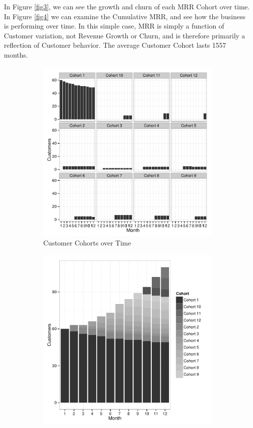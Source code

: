 \documentclass[11pt]{article}
\begin{document}
In Figure \ref{fig3}, we can see the growth and churn of each MRR Cohort over time. In Figure \ref{fig4} we can examine the Cumulative MRR, and see how the business is performing over time. In this simple case, MRR is simply a function of Customer variation, not Revenue Growth or Churn, and is therefore primarily a reflection of Customer behavior. The average Customer Cohort lasts 1557 months.

\begin{figure}
\centering
\begin{subfigure}{0.70\textwidth}
\centering
\includegraphics{TaaS-011}
\caption{Customer Cohorts over Time}
\label{fig1}
\end{subfigure}
\begin{subfigure}{0.70\textwidth}
\centering
\includegraphics{TaaS-012}

\end{subfigure}
\end{figure}
\end{document}
